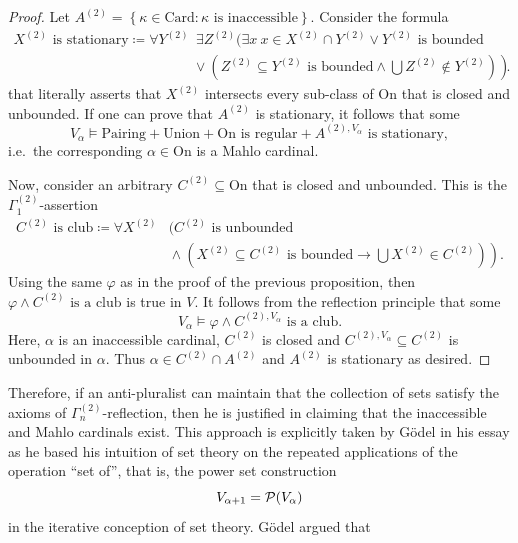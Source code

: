 \documentclass[12pt]{article}
\theoremstyle{plain}
\theoremstyle{definition}
\newcommand{\On}{\mathrm{On}}
\newcommand{\Card}{\mathrm{Card}}
\begin{document}
\begin{proof}
	Let $A^{(2)} = \left\{\kappa \in \Card : \text{$\kappa$ is inaccessible}\right\}$. Consider the formula
	\begin{align*}
		\text{$X^{(2)}$ is stationary} \coloneqq \forall Y^{(2)} & \ \exists Z^{(2)} \Big(\exists x \ x \in X^{(2)} \cap Y^{(2)} \lor \text{$Y^{(2)}$ is bounded}                         \\
		                                                         & \left.{} \lor \left(\text{$Z^{(2)} \subseteq Y^{(2)}$ is bounded} \land \bigcup Z^{(2)} \not\in Y^{(2)}\right)\right).
	\end{align*}
	that literally asserts that $X^{(2)}$ intersects every sub-class of $\On$ that is closed and unbounded. If one can prove that $A^{(2)}$ is stationary, it follows that some
	\[V_\alpha \vDash \text{Pairing} + \text{Union} + \text{$\On$ is regular} + \text{$A^{(2), V_\alpha}$ is stationary},\]
	i.e.\ the corresponding $\alpha \in \On$ is a Mahlo cardinal.

	Now, consider an arbitrary $C^{(2)} \subseteq \On$ that is closed and unbounded. This is the $\Gamma^{(2)}_1$-assertion
	\begin{align*}
		\text{$C^{(2)}$ is club} \coloneqq \forall X^{(2)} & \Big(\text{$C^{(2)}$ is unbounded}                                                                                        \\
		                                                   & \left.{} \land \left(\text{$X^{(2)} \subseteq C^{(2)}$ is bounded} \rightarrow \bigcup X^{(2)} \in C^{(2)}\right)\right).
	\end{align*}
	Using the same $\varphi$ as in the proof of the previous proposition, then $\varphi \land \text{$C^{(2)}$ is a club}$ is true in $V$. It follows from the reflection principle that some
	\[V_\alpha \vDash \varphi \land \text{$C^{(2), V_\alpha}$ is a club}.\]
	Here, $\alpha$ is an inaccessible cardinal, $C^{(2)}$ is closed and $C^{(2), V_\alpha} \subseteq C^{(2)}$ is unbounded in $\alpha$. Thus $\alpha \in C^{(2)} \cap A^{(2)}$ and $A^{(2)}$ is stationary as desired.
\end{proof}

Therefore, if an anti-pluralist can maintain that the collection of sets satisfy the axioms of $\Gamma^{(2)}_n$-reflection, then he is justified in claiming that the inaccessible and Mahlo cardinals exist. This approach is explicitly taken by G\"odel in his essay \cite{godel-continuum-axioms} as he based his intuition of set theory on the repeated applications of the operation ``set of'', that is, the power set construction
\[V_{\alpha + 1} = \mathcal{P}\mleft(V_\alpha\mright)\]
in the iterative conception of set theory. G\"odel argued that
\end{document}
